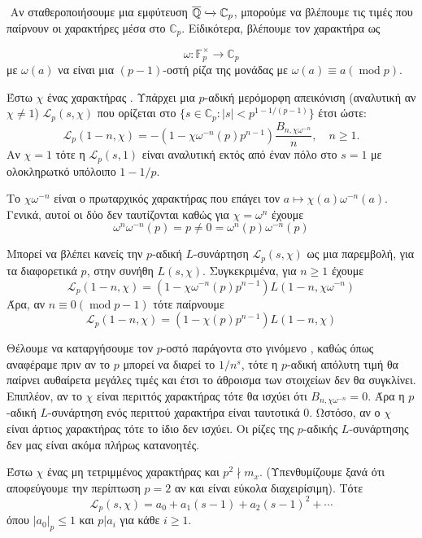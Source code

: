 $ $\newline
Αν σταθεροποιήσουμε μια εμφύτευση $\overline{\mathbb{Q}} \xhookrightarrow{} \mathbb{C}_p$, μπορούμε να βλέπουμε τις τιμές που παίρνουν 
οι  χαρακτήρες μέσα στο $\mathbb{C}_p$. Είδικότερα, βλέπουμε τον χαρακτήρα  ως

$$\omega: \mathbb{F}_p^\times \longrightarrow \mathbb{C}_p$$ με $\omega(a)$ να είναι μια $(p-1)$-οστή ρίζα της μονάδας 
με $\omega(a) \equiv a (\operatorname{mod}p)$.


\begin{theorem} \label{wash5.11}
	Έστω $\chi$ ένας χαρακτήρας . Υπάρχει μια $p$-αδική μερόμορφη απεικόνιση (αναλυτική αν $\chi \neq 1$) $\mathcal{L}_p(s,\chi)$ που ορίζεται στο $\{s \in \mathbb{C}_p: |s| < p^{1-1/(p-1)}\}$ έτσι ώστε:
	$$\mathcal{L}_p(1-n,\chi) = -(1-\chi \omega^{-n}(p)p^{n-1}) \frac{B_{n,\chi\omega^{-n}}}{n}, \quad n \geq 1.$$ Αν $\chi = 1$ τότε η $\mathcal{L}_p(s,1)$ είναι αναλυτική εκτός από έναν πόλο στο $s=1$ με ολοκληρωτκό υπόλοιπο $1-1/p$.
\end{theorem}

\noindent Το $\chi\omega^{-n}$ είναι ο πρωταρχικός χαρακτήρας που επάγει τον $a\mapsto \chi(a)\omega^{-n}(a)$. Γενικά, αυτοί οι δύο δεν ταυτίζονται καθώς για $\chi = \omega^n$ έχουμε
$$\omega^n \omega^{-n}(p) = p \neq 0 = \omega^n(p) \omega^{-n}(p)$$

\noindent Μπορεί να βλέπει κανείς την $p$-αδική $L$-συνάρτηση $\mathcal{L}_p(s,\chi)$ ως μια παρεμβολή, για τα διαφορετικά $p$, 
στην συνήθη $L(s,\chi)$. Συγκεκριμένα, για $n\geq 1$ έχουμε
$$\mathcal{L}_p (1-n,\chi) = (1-\chi\omega^{-n}(p)p^{n-1})L(1-n,\chi\omega^{-n})$$
Άρα, αν $n\equiv 0(\operatorname{mod}p-1)$ τότε παίρνουμε
$$\mathcal{L}_p(1-n,\chi) = (1-\chi(p)p^{n-1})L(1-n,\chi)$$

\noindent Θέλουμε να καταργήσουμε τον $p$-οστό παράγοντα στο γινόμενο , καθώς όπως αναφέραμε πριν αν το $p$ μπορεί να διαρεί 
το $1/n^s$, τότε η $p$-αδική απόλυτη τιμή θα παίρνει αυθαίρετα μεγάλες τιμές και έτσι το άθροισμα των στοιχείων δεν θα συγκλίνει.
Επιπλέον, αν το $\chi$ είναι περιττός χαρακτήρας τότε θα ισχύει ότι $B_{n,\chi\omega^{-n}}= 0$. Άρα η $p$-αδική $L$-συνάρτηση 
ενός περιττού χαρακτήρα είναι ταυτοτικά $0$. Ωστόσο, αν ο $\chi$ είναι άρτιος χαρακτήρας τότε το ίδιο δεν ισχύει. 
Οι ρίζες της $p$-αδικής $L$-συνάρτησης δεν μας είναι ακόμα πλήρως κατανοητές.

\begin{theorem} 
	Έστω $\chi$ ένας μη τετριμμένος χαρακτήρας και $p^2\nmid m_x$. (Υπενθυμίζουμε ξανά ότι αποφεύγουμε την περίπτωση $p=2$ αν και είναι εύκολα διαχειρίσιμη). Τότε
	$$\mathcal{L}_p(s,\chi) = a_0 + a_1(s-1) + a_2(s-1)^2 + \cdots$$ όπου $|a_0|_p \leq 1$ και $p | a_i$ για κάθε $i\geq 1$.
\end{theorem}


